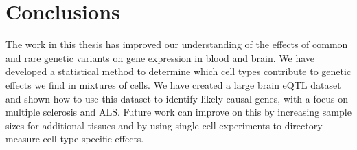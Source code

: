 \section{Conclusions}
The work in this thesis has improved our understanding of the effects of common and rare genetic variants on gene expression in blood and brain. We have developed a statistical method to determine which cell types contribute to genetic effects we find in mixtures of cells. We have created a large brain eQTL dataset and shown how to use this dataset to identify likely causal genes, with a focus on multiple sclerosis and ALS. Future work can improve on this by increasing sample sizes for additional tissues and by using single-cell experiments to directory measure cell type specific effects. 





